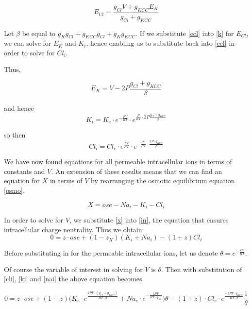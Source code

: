 \documentclass[a4paper,11pt]{article}
\begin{document}
\begin{equation} \label{ecl}
E_{Cl} = \frac{g_{Cl}V+g_{KCC}E_K}{g_{Cl}+g_{KCC}}
\end{equation}

Let $\beta$ be equal to $g_Kg_{Cl}+g_{KCC}g_{Cl}+g_Kg_{KCC}$. If we substitute \eqref{ecl} into \eqref{k} for $E_{Cl}$, we can solve for $E_K$ and $K_i$, hence enabling us to substitute back into \eqref{ecl} in order to solve for $Cl_i$.

Thus,

\begin{equation*}
E_K = V-2P\frac{g_{Cl}+g_{KCC}}{\beta}
\end{equation*}

and hence
\begin{equation} \label{ki}
K_i = K_e \cdot e^{-\frac{FV}{RT}} \cdot e^{\frac{F}{RT} \cdot 2P\frac{g_{Cl}+g_{KCC}}{\beta}}
\end{equation}

so then
\begin{equation} \label{cli}
Cl_i = Cl_e \cdot e^{\frac{FV}{RT}} \cdot e^{-\frac{F}{RT} \cdot \frac{2P \cdot g_{KCC}}{\beta}}
\end{equation}

We have now found equations for all permeable intracellular ions in terms of constants and $V$. An extension of these results means that we can find an equation for $X$ in terms of $V$ by rearranging the osmotic equilibrium equation \eqref{osmo}.

\begin{equation} \label{x}
X=ose-Na_i-K_i-Cl_i
\end{equation}

In order to solve for $V$, we substitute \eqref{x} into \eqref{in}, the equation that ensures intracellular charge neutrality. Thus we obtain:
\begin{equation*}
0=z\cdot ose + (1-z_X)(K_i+Na_i)-(1+z)Cl_i
\end{equation*}

Before substituting in for the permeable intracellular ions, let us denote $\theta = e^{-\frac{FV}{RT}}$.

Of course the variable of interest in solving for $V$ is $\theta$. Then with substitution of \eqref{cli}, \eqref{ki} and \eqref{nai} the above equation becomes

\begin{equation*}
0=z \cdot ose + (1-z)\Big(K_e \cdot e^{\frac{2 P F \cdot (g_{Cl}+ g_{KCC})}{RT \cdot \beta}} +Na_e \cdot e^{-\frac{3PF}{RT\cdot g_{Na}}} \Big)\theta - (1+z)\cdot Cl_e \cdot e^{\frac{-2PF\cdot g_{KCC}}{RT \cdot \beta}}\frac{1}{\theta} 
\end{equation*}
\end{document}
